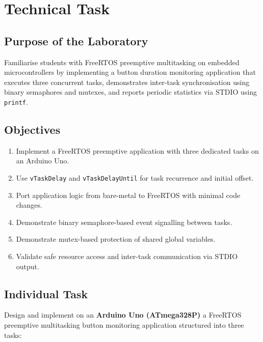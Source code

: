 \documentclass[12pt]{article}
\begin{document}
\setcounter{page}{2}
\pagestyle{fancy}
\fancyhf{}
\rhead{\thepage}

\section*{Technical Task}

\subsection*{Purpose of the Laboratory}
\hspace{0.8cm} Familiarise students with FreeRTOS preemptive multitasking on embedded microcontrollers by implementing a button duration monitoring application that executes three concurrent tasks, demonstrates inter-task synchronisation using binary semaphores and mutexes, and reports periodic statistics via STDIO using \texttt{printf}.

\subsection*{Objectives}
\begin{enumerate}
    \item Implement a FreeRTOS preemptive application with three dedicated tasks on an Arduino Uno.
    \item Use \texttt{vTaskDelay} and \texttt{vTaskDelayUntil} for task recurrence and initial offset.
    \item Port application logic from bare-metal to FreeRTOS with minimal code changes.
    \item Demonstrate binary semaphore-based event signalling between tasks.
    \item Demonstrate mutex-based protection of shared global variables.
    \item Validate safe resource access and inter-task communication via STDIO output.
\end{enumerate}

\subsection*{Individual Task}
\hspace{0.8cm} Design and implement on an \textbf{Arduino Uno (ATmega328P)} a FreeRTOS preemptive multitasking button monitoring application structured into three tasks:
\end{document}
